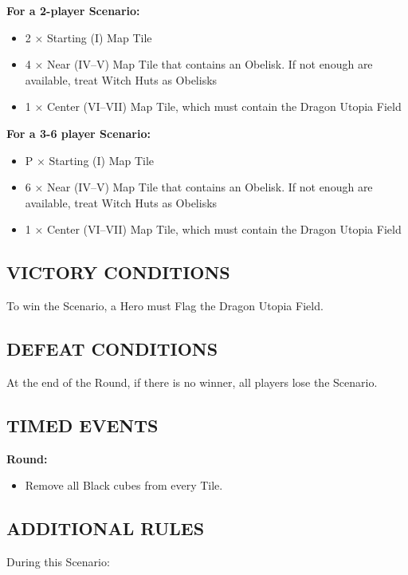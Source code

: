\begin{multicols}{2}
\textbf{For a 2-player Scenario:}
\begin{itemize}
  \item 2 × Starting (I) Map Tile
  \item 4 × Near (IV--V) Map Tile that contains an Obelisk. If not enough are available, treat Witch Huts as Obelisks
  \item 1 × Center (VI--VII) Map Tile, which must contain the Dragon Utopia Field
\end{itemize}

\textbf{For a 3-6 player Scenario:}
\begin{itemize}
  \item P × Starting (I) Map Tile
  \item 6 × Near (IV--V) Map Tile that contains an Obelisk. If not enough are available, treat Witch Huts as Obelisks
  \item 1 × Center (VI--VII) Map Tile, which must contain the Dragon Utopia Field
\end{itemize}

\subsection*{\MakeUppercase{Victory Conditions}}
To win the Scenario, a Hero must Flag the Dragon Utopia Field.

\subsection*{\MakeUppercase{Defeat Conditions}}
At the end of the  Round, if there is no winner, all players lose the Scenario.

\subsection*{\MakeUppercase{Timed Events}}

\textbf{ Round:}
\begin{itemize}
  \item Remove all Black cubes from every Tile.
\end{itemize}

\subsection*{\MakeUppercase{Additional Rules}}

During this Scenario:


\end{multicols}

